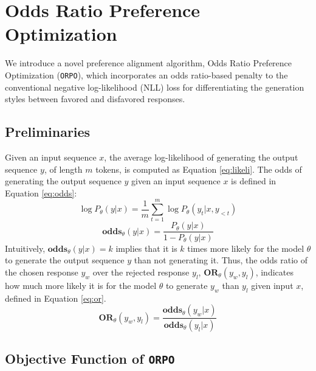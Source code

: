 \section{Odds Ratio Preference Optimization}\label{sec:method}
We introduce a novel preference alignment algorithm, Odds Ratio Preference Optimization (\texttt{ORPO}), which incorporates an odds ratio-based penalty to the conventional negative log-likelihood (NLL) loss for differentiating the generation styles between favored and disfavored responses.

\subsection{Preliminaries}
Given an input sequence $x$, the average log-likelihood of generating the output sequence $y$, of length $m$ tokens, is computed as Equation \ref{eq:likeli}. The odds of generating the output sequence $y$ given an input sequence $x$ is defined in Equation \ref{eq:odds}:
\begin{equation}
    \log P_\theta(y|x) = \frac{1}{m} \sum_{t=1}^m \log P_\theta(y_t|x, y_{<t})\label{eq:likeli}
\end{equation}
\begin{equation}
    \textbf{odds}_\theta(y|x) = \frac{P_\theta(y|x)}{1 - P_\theta(y|x)}\label{eq:odds}
\end{equation}
Intuitively, $\textbf{odds}_\theta(y|x) = k$ implies that it is $k$ times more likely for the model $\theta$ to generate the output sequence $y$ than not generating it. Thus, the odds ratio of the chosen response $y_w$ over the rejected response $y_l$, $\textbf{OR}_\theta(y_w, y_l)$, indicates how much more likely it is for the model $\theta$ to generate $y_w$ than $y_l$ given input $x$, defined in Equation \ref{eq:or}.
\begin{equation}
    \textbf{OR}_\theta(y_w, y_l) = \frac{\textbf{odds}_\theta(y_w|x)}{\textbf{odds}_\theta(y_l|x)}\label{eq:or}
\end{equation}

\subsection{Objective Function of \texttt{ORPO}}


